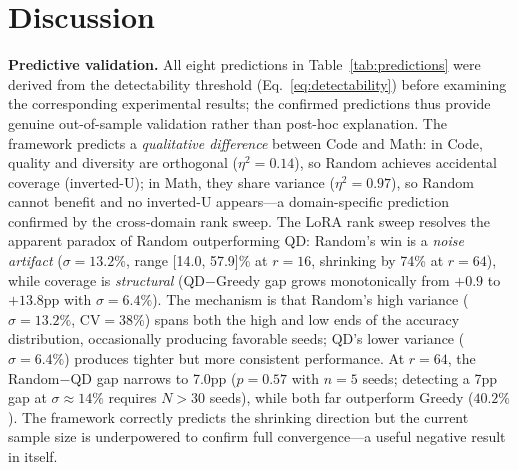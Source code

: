 \documentclass{article}
\theoremstyle{plain}
\theoremstyle{remark}
\begin{document}
\section{Discussion}
\label{sec:discussion}

\textbf{Predictive validation.}
All eight predictions in Table~\ref{tab:predictions} were derived from the detectability threshold (Eq.~\ref{eq:detectability}) before examining the corresponding experimental results; the confirmed predictions thus provide genuine out-of-sample validation rather than post-hoc explanation.
The framework predicts a \emph{qualitative difference} between Code and Math: in Code, quality and diversity are orthogonal ($\eta^2{=}0.14$), so Random achieves accidental coverage (inverted-U); in Math, they share variance ($\eta^2{=}0.97$), so Random cannot benefit and no inverted-U appears---a domain-specific prediction confirmed by the cross-domain rank sweep.
The LoRA rank sweep resolves the apparent paradox of Random outperforming QD: Random's win is a \emph{noise artifact} ($\sigma{=}13.2\%$, range [14.0, 57.9]\% at $r{=}16$, shrinking by 74\% at $r{=}64$), while coverage is \emph{structural} (QD$-$Greedy gap grows monotonically from $+0.9$ to $+13.8$pp with $\sigma{=}6.4\%$).
The mechanism is that Random's high variance ($\sigma{=}13.2\%$, CV$=$38\%) spans both the high and low ends of the accuracy distribution, occasionally producing favorable seeds; QD's lower variance ($\sigma{=}6.4\%$) produces tighter but more consistent performance.
At $r{=}64$, the Random$-$QD gap narrows to 7.0pp ($p{=}0.57$ with $n{=}5$ seeds; detecting a 7pp gap at $\sigma{\approx}14\%$ requires $N{>}30$ seeds), while both far outperform Greedy ($40.2\%$).
The framework correctly predicts the shrinking direction but the current sample size is underpowered to confirm full convergence---a useful negative result in itself.
\end{document}
